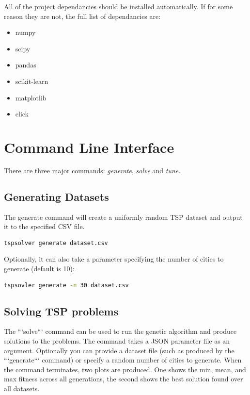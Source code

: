 \documentclass[journal]{IEEEtran}
\begin{document}
All of the project dependancies should be installed automatically. If for some reason they are not, the full list of dependancies are:

\begin{itemize}
	\item numpy
	\item scipy
	\item pandas
	\item scikit-learn
	\item matplotlib
	\item click
\end{itemize}

\section{Command Line Interface}
\label{appendix:cli}
There are three major commands: \textit{generate}, \textit{solve} and \textit{tune}. 

\subsection{Generating Datasets}
The generate command will create a uniformly random TSP dataset and output it to the specified CSV file.

\begin{lstlisting}[language=Bash]
tspsolver generate dataset.csv	
\end{lstlisting}

Optionally, it can also take a parameter specifying the number of cities to generate (default is 10):

\begin{lstlisting}[language=Bash]
tspsovler generate -n 30 dataset.csv	
\end{lstlisting}


\subsection{Solving TSP problems}
The ```solve``` command can be used to run the genetic algorithm and produce solutions to the problems. The command takes a JSON parameter file as an argument. Optionally you can provide a dataset file (such as produced by the ```generate``` command) or specify a random number of cities to generate. When the command terminates, two plots are produced. One shows the min, mean, and max fitness across all generations, the second shows the best solution found over all datasets.
\end{document}
